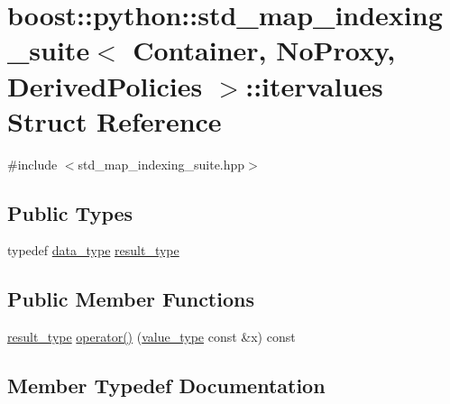\hypertarget{structboost_1_1python_1_1std__map__indexing__suite_1_1itervalues}{}\section{boost\+:\+:python\+:\+:std\+\_\+map\+\_\+indexing\+\_\+suite$<$ Container, No\+Proxy, Derived\+Policies $>$\+:\+:itervalues Struct Reference}
\label{structboost_1_1python_1_1std__map__indexing__suite_1_1itervalues}


{\ttfamily \#include $<$std\+\_\+map\+\_\+indexing\+\_\+suite.\+hpp$>$}

\subsection*{Public Types}
\begin{DoxyCompactItemize}
\item 
typedef \hyperlink{classboost_1_1python_1_1std__map__indexing__suite_a3e9a6a8b8ba34759cf0ba99fe5966041}{data\+\_\+type} \hyperlink{structboost_1_1python_1_1std__map__indexing__suite_1_1itervalues_a7d2f8df7d18009f2bad1363db4f718f3}{result\+\_\+type}
\end{DoxyCompactItemize}
\subsection*{Public Member Functions}
\begin{DoxyCompactItemize}
\item 
\hyperlink{structboost_1_1python_1_1std__map__indexing__suite_1_1itervalues_a7d2f8df7d18009f2bad1363db4f718f3}{result\+\_\+type} \hyperlink{structboost_1_1python_1_1std__map__indexing__suite_1_1itervalues_a36486ce19f8e08900aabe582d0502dc8}{operator()} (\hyperlink{classboost_1_1python_1_1std__map__indexing__suite_aff9ed68cf30e805a04a313d92c62ab38}{value\+\_\+type} const \&x) const 
\end{DoxyCompactItemize}


\subsection{Member Typedef Documentation}
\hypertarget{structboost_1_1python_1_1std__map__indexing__suite_1_1itervalues_a7d2f8df7d18009f2bad1363db4f718f3}{}
